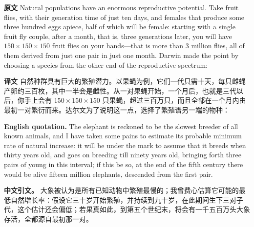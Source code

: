 \documentclass[UTF8,zihao=-4]{ctexart}
\newcommand{\BodyFont}{\fontsize{10.5pt}{15.5pt}\selectfont}
\renewenvironment{quote}{\par\noindent\begingroup\BodyFont}{\par\endgroup}
\begin{document}
\begin{quote}
\noindent\textbf{原文} Natural populations have an enormous reproductive potential. Take fruit flies, with their generation time of just ten days, and females that produce some three hundred eggs apiece, half of which will be female: starting with a single fruit fly couple, after a month, that is, three generations later, you will have \(150 \times 150 \times 150\) fruit flies on your hands---that is more than 3 million flies, all of them derived from just one pair in just one month. Darwin made the point by choosing a species from the other end of the reproductive spectrum:

\smallskip
\noindent\textbf{译文} 自然种群具有巨大的繁殖潜力。以果蝇为例，它们一代只需十天，每只雌蝇产卵约三百枚，其中一半会是雌性。从一对果蝇开始，一个月后，也就是三代以后，你手上会有 \(150 \times 150 \times 150\) 只果蝇，超过三百万只，而且全部在一个月内由最初一对繁衍而来。达尔文为了说明这一点，选择了繁殖谱另一端的物种：
\end{quote}

\begin{quote}
\noindent\textbf{English quotation.} The elephant is reckoned to be the slowest breeder of all known animals, and I have taken some pains to estimate its probable minimum rate of natural increase: it will be under the mark to assume that it breeds when thirty years old, and goes on breeding till ninety years old, bringing forth three pairs of young in this interval; if this be so, at the end of the fifth century there would be alive fifteen million elephants, descended from the first pair.

\smallskip
\noindent\textbf{中文引文。} 大象被认为是所有已知动物中繁殖最慢的；我曾费心估算它可能的最低自然增长率：假设它三十岁开始繁殖，并持续到九十岁，在此期间生下三对子代，这个估计还会偏低；若果真如此，到第五个世纪末，将会有一千五百万头大象存活，全都源自最初那一对。
\end{quote}
\end{document}
